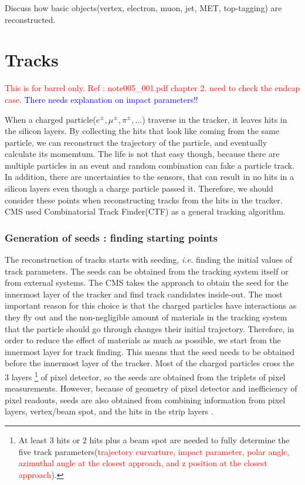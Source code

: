Discuss how basic objects(vertex, electron, muon, jet, MET, top-tagging) 
are reconstructed.

\section{ Tracks }
\label{sec:track}
\textcolor{red}{This is for barrel only. 
Ref : note005\_001.pdf chapter 2.
need to check the endcap case.}
\textcolor{blue}{There needs explanation on impact parameters!!} 

When a charged particle($e^\pm, \mu^\pm, \pi^\pm, ... $) traverse in the tracker,
it leaves hits in the silicon layers. By collecting the hits that 
look like coming from the same particle, we can reconstruct the 
trajectory of the particle, and eventually calculate its momemtum. 
The life is not that easy though, because there are multiple 
particles in an event and random combination can fake a particle track.  
In addition, there are uncertainties to the sensors, that 
can result in no hits in a silicon layers even though a charge 
particle passed it. Therefore, we should consider these points 
when reconstructing tracks from the hits in the tracker. 
CMS used Combinatorial Track Finder(CTF) as a general tracking 
algorithm.


\subsubsection{Generation of seeds : finding starting points}

The reconstruction of tracks starts with seeding, \textit{i.e.} 
finding the initial values of track parameters. 
The seeds can be obtained from the tracking system itself or from external systems.  
The CMS takes the approach to obtain the seed for the innermost layer 
of the tracker and find track candidates inside-out. 
The most important reason for this choice is that the 
charged particles have interactions as they fly out
and the non-negligible amount of materials in the tracking system 
that the particle should go through changes their initial trajectory.
Therefore, in order to reduce the effect of materials as much as possible, 
we start from the innermost layer for track finding. 
This means that the seed needs to be obtained before the innermost 
layer of the tracker. Most of the charged particles cross the 3 layers 
\footnote{At least 3 hits or 2 hits plus a beam spot are needed to 
fully determine the five track parameters(\textcolor{red}{trajectory curvarture,
impact parameter, polar angle, azimuthal angle at the closest approach, 
and z position at the closest approach}).}
of pixel detector, so the seeds are obtained from the triplets of pixel measurements. 
However, because of geometry of pixel detector and inefficiency of pixel readouts, 
seeds are also obtained from combining information from pixel layers, 
vertex/beam spot, and the hits in the strip layers \cite{cmstdr1}.   

